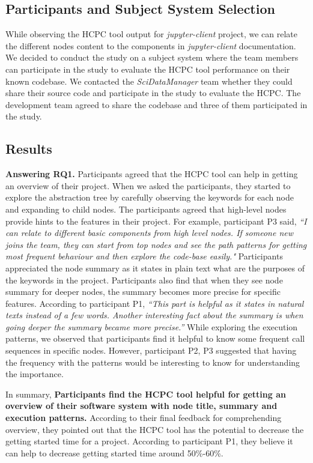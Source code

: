 \subsection{Participants and Subject System Selection}
While observing the HCPC tool output for \emph{jupyter-client} project, we can relate the different nodes content to the components in \emph{jupyter-client} documentation. We decided to conduct the study on a subject system where the team members can participate in the study to evaluate the HCPC tool performance on their known codebase. We contacted the \emph{SciDataManager} team whether they could share their source code and participate in the study to evaluate the HCPC. The development team agreed to share the codebase and three of them participated in the study. 
\subsection{Results}
\textbf{Answering RQ1.} Participants agreed that the HCPC tool can help in getting an overview of their project. When we asked the participants, they started to explore the abstraction tree by carefully observing the keywords for each node and expanding to child nodes. The participants agreed that high-level nodes provide hints to the features in their project. For example, participant P3 said, \emph{``I can relate to different basic components from high level nodes. If someone new joins the team, they can start from top nodes and see the path patterns for getting most frequent behaviour and then explore the code-base easily."} Participants appreciated the node summary as it states in plain text what are the purposes of the keywords in the project. Participants also find that when they see node summary for deeper nodes, the summary becomes more precise for specific features. 
According to participant P1, \emph{``This part is helpful as it states in natural texts instead of a few words. Another interesting fact about the summary is when going deeper the summary became more precise.''} While exploring the execution patterns, we observed that participants find it helpful to know some frequent call sequences in specific nodes. However, participant P2, P3 suggested that having the frequency with the patterns would be interesting to know for understanding the importance. 

In summary, \textbf{Participants find the HCPC tool helpful for getting an overview of their software system with node title, summary and execution patterns.} According to their final feedback for comprehending overview, they pointed out that the HCPC tool has the potential to decrease the getting started time for a project. According to participant P1, they believe  it can help to decrease getting started time around 50\%-60\%.

